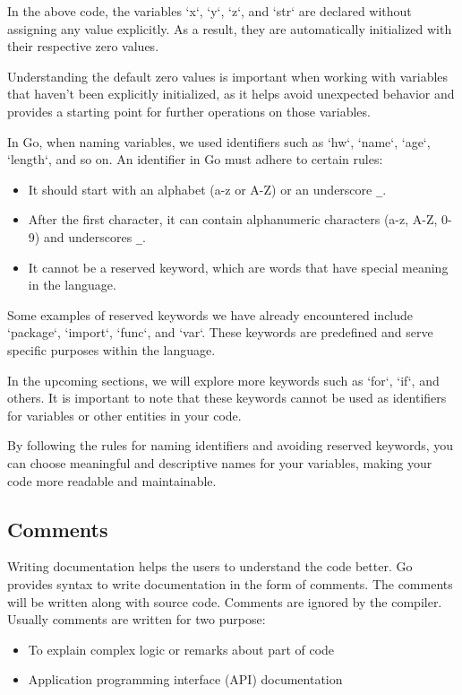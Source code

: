 In the above code, the variables `x`, `y`, `z`, and `str` are declared without
assigning any value explicitly. As a result, they are automatically initialized
with their respective zero values.

Understanding the default zero values is important when working with variables
that haven't been explicitly initialized, as it helps avoid unexpected behavior
and provides a starting point for further operations on those variables.

In Go, when naming variables, we used identifiers such as `hw`, `name`, `age`,
`length`, and so on. An identifier in Go must adhere to certain rules:

\begin{itemize}
\item It should start with an alphabet (a-z or A-Z) or an underscore \texttt{\_}.
\item After the first character, it can contain alphanumeric characters (a-z, A-Z, 0-9) and underscores \texttt{\_}.
\item It cannot be a reserved keyword, which are words that have special meaning in the language.
\end{itemize}

Some examples of reserved keywords we have already encountered include
`package`, `import`, `func`, and `var`. These keywords are predefined and serve
specific purposes within the language.

In the upcoming sections, we will explore more keywords such as `for`, `if`, and
others. It is important to note that these keywords cannot be used as
identifiers for variables or other entities in your code.

By following the rules for naming identifiers and avoiding reserved keywords,
you can choose meaningful and descriptive names for your variables, making your
code more readable and maintainable.

\subsection{Comments}

Writing documentation helps the users to understand the code better.
Go provides syntax to write documentation in the form of
comments.  The comments will be written along with
source code.  Comments are ignored by the compiler.  Usually comments
are written for two purpose:

\begin{itemize}
  \item To explain complex logic or remarks about part of code
  \item Application programming interface (API) documentation
\end{itemize}

